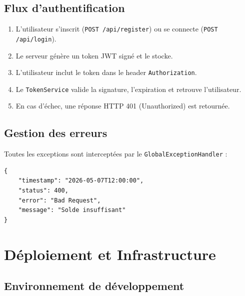 \documentclass[12pt,a4paper]{article}
\begin{document}
\subsection{Flux d'authentification}

\begin{enumerate}
    \item L'utilisateur s'inscrit (\texttt{POST /api/register}) ou se connecte (\texttt{POST /api/login}).
    \item Le serveur génère un token JWT signé et le stocke.
    \item L'utilisateur inclut le token dans le header \texttt{Authorization}.
    \item Le \texttt{TokenService} valide la signature, l'expiration et retrouve l'utilisateur.
    \item En cas d'échec, une réponse HTTP 401 (Unauthorized) est retournée.
\end{enumerate}

\subsection{Gestion des erreurs}
Toutes les exceptions sont interceptées par le \texttt{GlobalExceptionHandler} :

\begin{lstlisting}[caption={Format standardisé des réponses d'erreur}]
{
    "timestamp": "2026-05-07T12:00:00",
    "status": 400,
    "error": "Bad Request",
    "message": "Solde insuffisant"
}
\end{lstlisting}

\section{Déploiement et Infrastructure}

\subsection{Environnement de développement}
\end{document}
